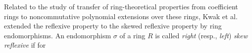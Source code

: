\documentclass{amsart}
\theoremstyle{definition}
\theoremstyle{remark}
\numberwithin{equation}{section}
\begin{document}
Related to the study of transfer of ring-theoretical properties from coefficient rings to noncommutative polynomial extensions over these rings, 
Kwak et al. \cite{Kwaketal2014} extended the reflexive property to the skewed reflexive property by ring endomorphisms. An endomorphism $\sigma$ of a ring $R$ is called \textit{right} (resp., \textit{left}) \textit{skew reflexive} if for
\end{document}
